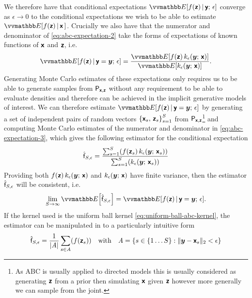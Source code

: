 We therefore have that conditional expectations $\expc{f(\rvct{z}) \gvn \rvct{y};\,\epsilon}$ converge as $\epsilon \to 0$ to the conditional expectations we wish to be able to estimate $\expc{f(\rvct{z}) \gvn \rvct{x}\,}$. Crucially we also have that the numerator and denominator of \eqref{eq:abc-expectation-2} take the forms of expectations of known functions of $\boldsymbol{\mathsf{x}}$ and $\boldsymbol{\mathsf{z}}$, i.e.
\begin{equation}
  \label{eq:abc-expectation-3}
  \expc{f(\rvct{z}) \gvn \rvct{y} = \vct{y};\,\epsilon} 
  =
  \frac{
    \expc{f(\rvct{z})\,k_{\epsilon}(\vct{y};\,\rvct{x})}
  }
  {
    \expc{k_\epsilon(\vct{y};\,\rvct{x})}
  }.
\end{equation}
Generating Monte Carlo estimates of these expectations only requires us to be able to generate samples from $\mathsf{P}_{\boldsymbol{\mathsf{x}},\boldsymbol{\mathsf{z}}}$ without any requirement to be able to evaluate densities and therefore can be achieved in the implicit generative models of interest. We can therefore estimate $\expc{f(\rvct{z}) \gvn \rvct{y} = \vct{y};\,\epsilon}$ by generating a set of independent pairs of random vectors $\lbr \rvct{x}_s,\,\rvct{z}_s \rbr_{s=1}^S$ from $\mathsf{P}_{\boldsymbol{\mathsf{x}},\boldsymbol{\mathsf{z}}}$\footnote{As \ac{ABC} is usually applied to directed models this is usually considered as generating $\boldsymbol{\mathsf{z}}$ from a prior then simulating $\boldsymbol{\mathsf{x}}$ given $\boldsymbol{\mathsf{z}}$ however more generally we can sample from the joint.} and computing Monte Carlo estimates of the numerator and denominator in \eqref{eq:abc-expectation-3}, which gives the following estimator for the conditional expectation
\begin{equation}\label{eq:abc-kernel-estimator}
  \hat{\rvar{f}}_{S,\epsilon} =
  \frac{
  \sum_{s=1}^S \lpa 
    f\lpa\rvct{z}_s\rpa \, 
    k_\epsilon\lpa\vct{y};\,\rvct{x}_s\rpa 
  \rpa
  }
  {
  \sum_{s=1}^S \lpa 
    k_\epsilon\lpa\vct{y};\,\rvct{x}_s\rpa 
  \rpa
  }
\end{equation}
Providing both $f(\boldsymbol{\mathsf{z}})\,k_{\epsilon}(\boldsymbol{y};\,\boldsymbol{\mathsf{x}})$ and $k_{\epsilon}(\boldsymbol{y};\,\boldsymbol{\mathsf{x}})$ have finite variance, then the estimator $\hat{\mathsf{f}}_{S,\epsilon}$ will be consistent, i.e.
\begin{equation}
  \lim_{S\to \infty} \expc{\hat{\rvar{f}}_{S,\epsilon}} = \expc{f(\rvct{z}) \gvn \rvct{y} = \vct{y};\,\epsilon}.
\end{equation}
If the kernel used is the uniform ball kernel \eqref{eq:uniform-ball-abc-kernel}, the estimator can be manipulated in to a particularly intuitive form
\begin{equation}\label{eq:abc-reject-estimator}
  \hat{\rvar{f}}_{S,\epsilon} =
  \frac{1}{|\set{A}|}
  \sum_{s\in\set{A}} \lpa 
    f\lpa\rvct{z}_s\rpa
  \rpa
  \quad
  \textrm{with}
  \quad
  \set{A} = \lbr s \in \lbrace 1 \dots S \rbrace : \Vert \vct{y} - \rvct{x}_s \Vert_2 < \epsilon \rbr
\end{equation}
